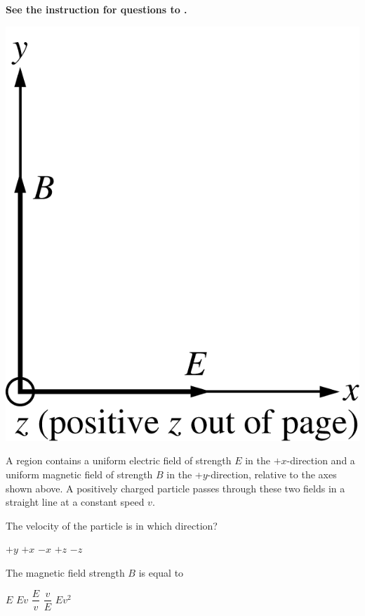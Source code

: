 \textbf{See the instruction for questions  to .}

\begin{center}
\includegraphics[scale=0.2]{images/img-004-004.png}
\end{center}

A region contains a uniform electric field of strength $E$ in the $+x$-direction and a uniform magnetic field of strength $B$ in the +$y$-direction, relative to the axes shown above. A positively charged particle passes through these two fields in a straight line at a constant speed $v$.

\begin{questions}\setcounter{question}{5}\question
The velocity of the particle is in which direction?

\begin{oneparchoices}
\choice $+y$
\choice $+x$
\choice $-x$
\choice $+z$
\choice $-z$
\end{oneparchoices}\end{questions}

\begin{questions}\setcounter{question}{6}\question
The magnetic field strength $B$ is equal to

\begin{oneparchoices}
\choice $E$
\choice $E v$
\choice $\dfrac{E}{v}$
\choice $\dfrac{v}{E}$
\choice $E v^{2}$
\end{oneparchoices}\end{questions}

